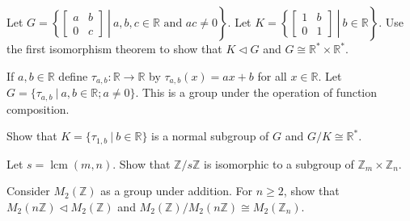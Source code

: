 
\newcommand{\C}{\mathbb{C}}
\newcommand{\R}{\mathbb{R}}
\newcommand{\Z}{\mathbb{Z}}
\newcommand{\lcm}{\operatorname{lcm}}


Let $G=\left.\left\{\begin{bmatrix}a&b\\0&c\end{bmatrix}\ \right|\ a,b,c\in \R \text{ and }ac\neq 0\right\}$. Let $K=\left.\left\{\begin{bmatrix}1&b\\0&1\end{bmatrix}\ \right|\ b\in \R\right\}$. Use the first isomorphism theorem to show that $K\lhd G$ and $G\cong \R^*\times \R^*$.
	

If $a,b\in \R$ define $\tau_{a,b}:\R\to \R$ by $\tau_{a,b}(x)=ax+b$ for all $x\in \R$.  Let $G=\{\tau_{a,b}\ |\ a,b\in\R; a\neq 0\}$.  This is a group under the operation of function composition.

Show that $K=\{\tau_{1,b}\ |\ b\in \R\}$ is a normal subgroup of $G$ and $G/K\cong\R^*$.


Let $s=\lcm(m,n)$.  Show that $\Z/s\Z$ is isomorphic to a subgroup of $\Z_m\times \Z_n$.


Consider $M_2(\Z)$ as a group under addition. For $n\geq 2$, show that $M_2(n\Z)\lhd M_2(\Z)$ and $M_2(\Z)/M_2(n\Z)\cong M_2(\Z_n)$.